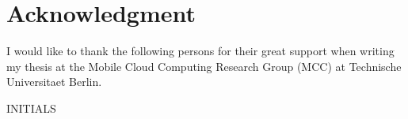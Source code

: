 
\cleardoublepage
{}
\section*{Acknowledgment}

I would like to thank the following persons for their great support when writing my thesis at the Mobile Cloud Computing Research Group (MCC) at Technische Universitaet Berlin.

\begin{flushright}
INITIALS\\[1pc]
\end{flushright}
